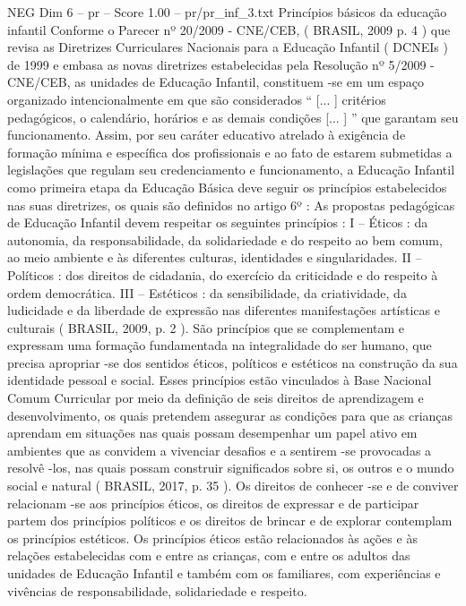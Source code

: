 \begin{textsample}{NEG Dim 6 – pr – Score 1.00 – pr/pr\_inf\_3.txt}  \label{ex:f6_neg_269}
Princípios básicos da educação infantil Conforme o Parecer nº 20/2009 - CNE/CEB, ( BRASIL, 2009 p. 4 ) que revisa as Diretrizes Curriculares Nacionais para a Educação Infantil ( DCNEIs ) de 1999 e embasa as novas diretrizes estabelecidas pela Resolução nº 5/2009 - CNE/CEB, as unidades de Educação Infantil, constituem -se em um espaço organizado intencionalmente em que são considerados “ [... ] critérios pedagógicos, o calendário, horários e as demais condições [... ] ” que garantam seu funcionamento.
Assim, por seu caráter educativo atrelado à exigência de formação mínima e específica dos profissionais e ao fato de estarem submetidas a legislações que regulam seu credenciamento e funcionamento, a Educação Infantil como primeira etapa da Educação Básica deve seguir os princípios estabelecidos nas suas diretrizes, os quais são definidos no artigo 6º : As propostas pedagógicas de Educação Infantil devem respeitar os seguintes princípios : I – Éticos : da autonomia, da responsabilidade, da solidariedade e do respeito ao bem comum, ao meio ambiente e às diferentes culturas, identidades e singularidades.
II – Políticos : dos direitos de cidadania, do exercício da criticidade e do respeito à ordem democrática.
III – Estéticos : da sensibilidade, da criatividade, da ludicidade e da liberdade de expressão nas diferentes manifestações artísticas e culturais ( BRASIL, 2009, p. 2 ).
São princípios que se complementam e expressam uma formação fundamentada na integralidade do ser humano, que precisa apropriar -se dos sentidos éticos, políticos e estéticos na construção da sua identidade pessoal e social.
Esses princípios estão vinculados à Base Nacional Comum Curricular por meio da definição de seis direitos de aprendizagem e desenvolvimento, os quais pretendem assegurar as condições para que as crianças aprendam em situações nas quais possam desempenhar um papel ativo em ambientes que as convidem a vivenciar desafios e a sentirem -se provocadas a resolvê -los, nas quais possam construir significados sobre si, os outros e o mundo social e natural ( BRASIL, 2017, p. 35 ).
Os direitos de conhecer -se e de conviver relacionam -se aos princípios éticos, os direitos de expressar e de participar partem dos princípios políticos e os direitos de brincar e de explorar contemplam os princípios estéticos.
Os princípios éticos estão relacionados às ações e às relações estabelecidas com e entre as crianças, com e entre os adultos das unidades de Educação Infantil e também com os familiares, com experiências e vivências de responsabilidade, solidariedade e respeito.

\end{textsample}
